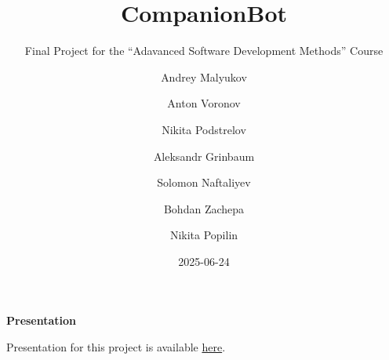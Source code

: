 \documentclass[
  letterpaper,
  DIV=11,
  numbers=noendperiod]{scrartcl}
\title{CompanionBot}
\subtitle{Final Project for the ``Adavanced Software Development
Methods'' Course}
\author{Andrey Malyukov \and Anton Voronov \and Nikita
Podstrelov \and Aleksandr Grinbaum \and Solomon Naftaliyev \and Bohdan
Zachepa \and Nikita Popilin}
\date{2025-06-24}
\renewcommand*\contentsname{Table of contents}
\newcommand\contentsname{Table of contents}
\begin{document}
\maketitle

\renewcommand*\contentsname{Table of contents}
{
\hypersetup{linkcolor=}
\setcounter{tocdepth}{3}
\tableofcontents
}

\begin{tcolorbox}[enhanced jigsaw, leftrule=.75mm, bottomrule=.15mm, left=2mm, arc=.35mm, colback=white, colframe=quarto-callout-tip-color-frame, rightrule=.15mm, opacityback=0, breakable, toprule=.15mm]
\begin{minipage}[t]{5.5mm}
\textcolor{quarto-callout-tip-color}{\faLightbulb}
\end{minipage}%
\begin{minipage}[t]{\textwidth - 5.5mm}

\vspace{-3mm}\textbf{Presentation}\vspace{3mm}

Presentation for this project is available
\href{./companionbot-presentation.pdf}{here}.

\end{minipage}%
\end{tcolorbox}

\newpage{}
\end{document}
